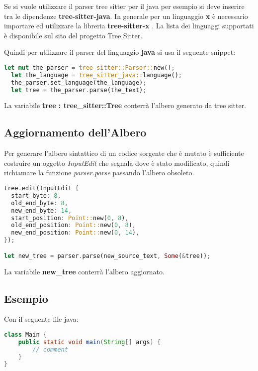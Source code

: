 Se si vuole utilizzare il parser tree sitter per il java per esempio si deve inserire tra le dipendenze \textbf{tree-sitter-java}.
In generale per un linguaggio \textbf{x} \`e necessario importare ed utilizzare la libreria \textbf{tree-sitter-x} \cite{TreeSitterRustGrammars}.
La lista dei linguaggi supportati \`e disponibile sul sito del progetto Tree Sitter.

Quindi per utilizzare il parser del linguaggio \textbf{java} si usa il seguente snippet:

\begin{lstlisting}[language=Rust]
  let mut the_parser = tree_sitter::Parser::new();
  let the_language = tree_sitter_java::language();
  the_parser.set_language(the_language);
  let tree = the_parser.parse(the_text);
\end{lstlisting}

La variabile \textbf{tree : tree\_sitter::Tree} conterr\`a l'albero generato da tree sitter.

\subsection{Aggiornamento dell'Albero}

Per generare l'albero sintattico di un codice sorgente che \`e mutato \`e sufficiente costruire un oggetto \emph{InputEdit} che segnala dove \`e stato modificato, quindi richiamare la funzione \emph{parser.parse} passando l'albero obsoleto.

\begin{lstlisting}[language=Rust]
tree.edit(InputEdit {
  start_byte: 8,
  old_end_byte: 8,
  new_end_byte: 14,
  start_position: Point::new(0, 8),
  old_end_position: Point::new(0, 8),
  new_end_position: Point::new(0, 14),
});

let new_tree = parser.parse(new_source_text, Some(&tree));
\end{lstlisting}

La variabile \textbf{new\_tree} conterr\`a l'albero aggiornato.

\subsection{Esempio}

Con il seguente file java:

\begin{lstlisting}[language=Java]
class Main {
	public static void main(String[] args) {
    	// comment
    }
}
\end{lstlisting}


